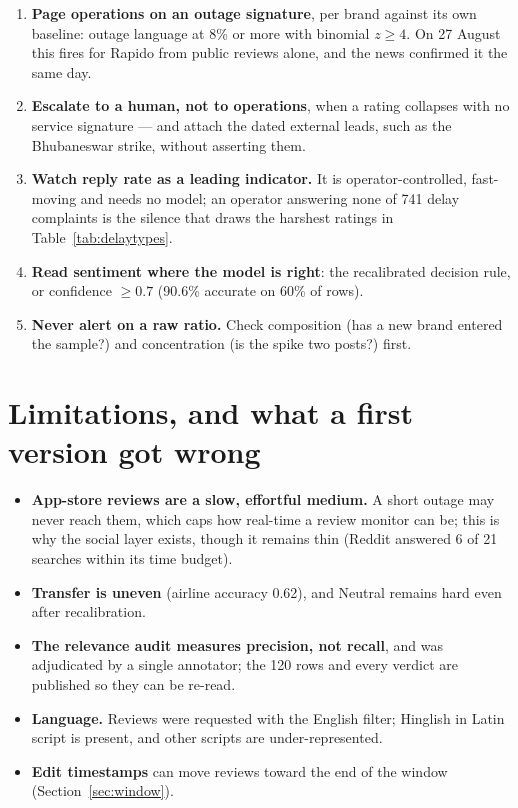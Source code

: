 \documentclass[11pt,a4paper]{article}
\begin{document}
\begin{enumerate}
\item \textbf{Page operations on an outage signature}, per brand against its own baseline: outage language at 8\% or more with binomial $z\geq4$. On 27 August this fires for Rapido from public reviews alone, and the news confirmed it the same day.
\item \textbf{Escalate to a human, not to operations}, when a rating collapses with no service signature --- and attach the dated external leads, such as the Bhubaneswar strike, without asserting them.
\item \textbf{Watch reply rate as a leading indicator.} It is operator-controlled, fast-moving and needs no model; an operator answering none of 741 delay complaints is the silence that draws the harshest ratings in Table~\ref{tab:delaytypes}.
\item \textbf{Read sentiment where the model is right}: the recalibrated decision rule, or confidence $\geq0.7$ (90.6\% accurate on 60\% of rows).
\item \textbf{Never alert on a raw ratio.} Check composition (has a new brand entered the sample?) and concentration (is the spike two posts?) first.
\end{enumerate}

\section{Limitations, and what a first version got wrong}\label{sec:limits}

\begin{itemize}
\item \textbf{App-store reviews are a slow, effortful medium.} A short outage may never reach them, which caps how real-time a review monitor can be; this is why the social layer exists, though it remains thin (Reddit answered 6 of 21 searches within its time budget).
\item \textbf{Transfer is uneven} (airline accuracy 0.62), and Neutral remains hard even after recalibration.
\item \textbf{The relevance audit measures precision, not recall}, and was adjudicated by a single annotator; the 120 rows and every verdict are published so they can be re-read.
\item \textbf{Language.} Reviews were requested with the English filter; Hinglish in Latin script is present, and other scripts are under-represented.
\item \textbf{Edit timestamps} can move reviews toward the end of the window (Section~\ref{sec:window}).
\end{itemize}
\end{document}
